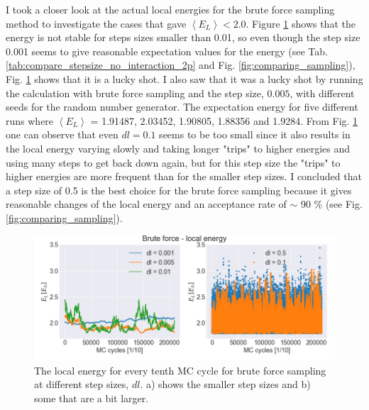 I took a closer look at the actual local energies for the brute force sampling method to investigate the cases that gave $\left< E_L \right> < 2.0$. Figure \ref{fig:local_energy_step_size_brute_force} shows that the energy is not stable for steps sizes smaller than 0.01, so even though the step size 0.001 seems to give reasonable expectation values for the energy (see Tab. \ref{tab:compare_stepsize_no_interaction_2p} and Fig. \ref{fig:comparing_sampling}), Fig. \ref{fig:local_energy_step_size_brute_force} shows that it is a lucky shot. I also saw that it was a lucky shot by running the calculation with brute force sampling and the step size, $0.005$, with different seeds for the random number generator. The expectation energy for five different runs where $\left< E_L \right>$ =  1.91487, 2.03452, 1.90805, 1.88356 and 1.9284. From Fig. \ref{fig:local_energy_step_size_brute_force} one can observe that even $dl=0.1$ seems to be too small since it also results in the local energy varying slowly and taking longer "trips" to higher energies and using many steps to get back down again, but for this step size the "trips" to higher energies are more frequent than for the smaller step sizes. I concluded that a step size of 0.5 is the best choice for the brute force sampling because it gives reasonable changes of the local energy and an acceptance rate of $\sim$ 90 \% (see Fig. \ref{fig:comparing_sampling}). 

\begin{figure}[H]
\center
\includegraphics[width=0.85\linewidth]{../Results/local_energy_step_sizes}\caption{The local energy for every tenth MC cycle for brute force sampling at different step sizes, $dl$. a) shows the smaller step sizes and b) some that are a bit larger.}\label{fig:local_energy_step_size_brute_force}
\end{figure}

%

